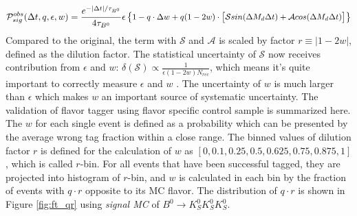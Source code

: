 \begin{equation}\label{eq:tdcpv_all_ft}
\small
\mathcal{P}_{sig}^{obs}(\Delta t, q, \epsilon, w) = 
\frac{e^{-|\Delta t|/\tau_{B^0}}}{4\tau_{B^0}}
\epsilon
\begin{Bmatrix}
1 - q\cdot \Delta w+ q(1-2w)\cdot 
\begin{bmatrix}
\mathcal{S}sin(\Delta M_d \Delta t) + 
\mathcal{A}cos(\Delta M_d \Delta t)
\end{bmatrix}
\end{Bmatrix}
\end{equation} 
Compared to the original, the term with $\mathcal{S}$ and $\mathcal{A}$ is scaled by factor $r\equiv |1-2w|$, defined as the dilution factor. The statistical uncertainty of $\mathcal{S}$ now receives contribution from $\epsilon$ and $w$: $\delta(\mathcal{S}) \propto \frac{1}{\epsilon (1-2w)N_{rec}}$, which means it's quite important to correctly measure $\epsilon$ and $w$ . The uncertainty of $w$ is much larger than $\epsilon$ which makes $w$ an important source of systematic uncertainty. The validation of flavor tagger using flavor specific control sample is summarized here\cite{flavortagger}. The $w$ for each single event is defined as a probability which can be presented by the average wrong tag fraction within a close range. The binned values of dilution factor $r$ is defined for the calculation of $w$ as $[0,0.1,0.25,0.5,0.625,0.75,0.875,1]$, which is called $r$-bin. For all events that have been successful tagged, they are projected into histogram of $r$-bin, and $w$ is calculated in each bin by the fraction of events with $q\cdot r$ opposite to its MC flavor. The distribution of $q\cdot r$ is shown in Figure \ref{fig:ft_qr} using \textit{signal MC} of $B^0 \to K_S^0  K_S^0  K_S^0$. 

